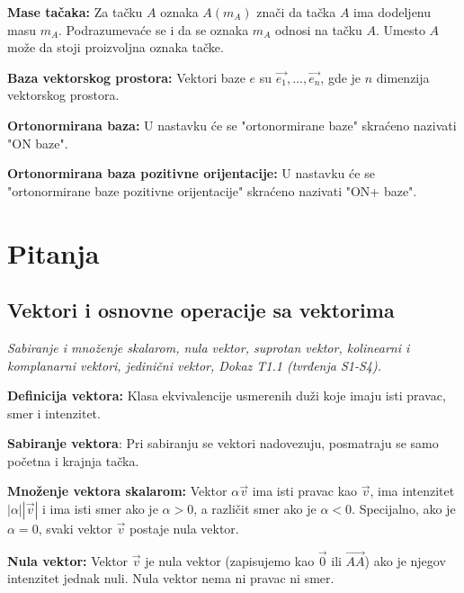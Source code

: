 \documentclass[12pt]{article}
\newcommand{\vek}[1]{\overrightarrow{#1}}
\begin{document}
\par

\textbf{Mase tačaka:} Za tačku $A$ oznaka $A(m_A)$ znači da tačka $A$ ima
dodeljenu masu $m_A$. Podrazumevaće se i da se oznaka $m_A$ odnosi na tačku
$A$. Umesto $A$ može da stoji proizvoljna oznaka tačke.

\par

\textbf{Baza vektorskog prostora:} Vektori baze $e$ su
$\vek{e_1},\dotsc,\vek{e_n}$, gde je $n$ dimenzija vektorskog prostora.

\par

\textbf{Ortonormirana baza:} U nastavku će se "ortonormirane baze" skraćeno
nazivati "ON baze".

\par

\textbf{Ortonormirana baza pozitivne orijentacije:} U nastavku će se
"ortonormirane baze pozitivne orijentacije" skraćeno nazivati "ON+ baze".

\newpage

\section{Pitanja}
\subsection{Vektori i osnovne operacije sa vektorima}
\textit{Sabiranje i množenje skalarom, nula vektor, suprotan vektor, kolinearni
    i komplanarni vektori, jedinični vektor, Dokaz T1.1 (tvrđenja S1-S4).}
\par
\vspace*{1cm}

\textbf{Definicija vektora:} Klasa ekvivalencije usmerenih duži koje imaju isti
pravac, smer i intenzitet.
\par

\textbf{Sabiranje vektora}: Pri sabiranju se vektori nadovezuju, posmatraju se
samo početna i krajnja tačka.
\par

\textbf{Množenje vektora skalarom:} Vektor $\alpha\vek{v}$ ima isti pravac
kao $\vek{v}$, ima intenzitet $|\alpha||\vek{v}|$ i ima isti smer ako je
$\alpha>0$, a različit smer ako je $\alpha<0$. Specijalno, ako je $\alpha=0$,
svaki vektor $\vek{v}$ postaje nula vektor.
\par

\textbf{Nula vektor:} Vektor $\vek{v}$ je nula vektor (zapisujemo kao $\vek{0}$
ili $\vek{AA}$) ako je njegov intenzitet jednak nuli. Nula vektor nema ni
pravac ni smer.
\par
\end{document}
